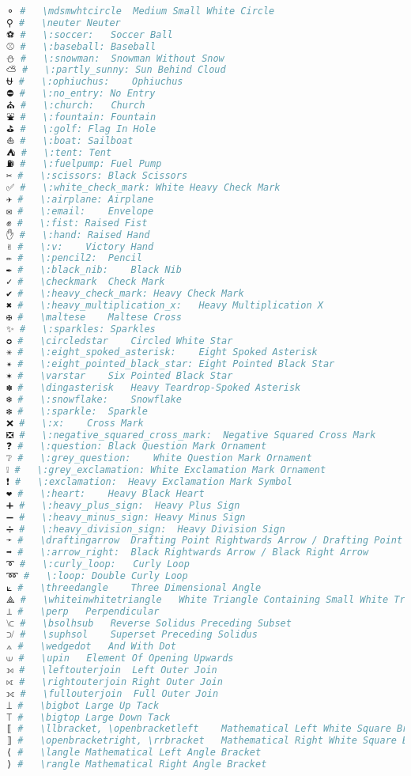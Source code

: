 \begin{lstlisting}[language=Julia, style=julia, linewidth=\textwidth]
⚬ #   \mdsmwhtcircle  Medium Small White Circle
⚲ #   \neuter Neuter
⚽ #   \:soccer:   Soccer Ball
⚾ #   \:baseball: Baseball
⛄ #   \:snowman:  Snowman Without Snow
⛅ #   \:partly_sunny: Sun Behind Cloud
⛎ #   \:ophiuchus:    Ophiuchus
⛔ #   \:no_entry: No Entry
⛪ #   \:church:   Church
⛲ #   \:fountain: Fountain
⛳ #   \:golf: Flag In Hole
⛵ #   \:boat: Sailboat
⛺ #   \:tent: Tent
⛽ #   \:fuelpump: Fuel Pump
✂ #   \:scissors: Black Scissors
✅ #   \:white_check_mark: White Heavy Check Mark
✈ #   \:airplane: Airplane
✉ #   \:email:    Envelope
✊ #   \:fist: Raised Fist
✋ #   \:hand: Raised Hand
✌ #   \:v:    Victory Hand
✏ #   \:pencil2:  Pencil
✒ #   \:black_nib:    Black Nib
✓ #   \checkmark  Check Mark
✔ #   \:heavy_check_mark: Heavy Check Mark
✖ #   \:heavy_multiplication_x:   Heavy Multiplication X
✠ #   \maltese    Maltese Cross
✨ #   \:sparkles: Sparkles
✪ #   \circledstar    Circled White Star
✳ #   \:eight_spoked_asterisk:    Eight Spoked Asterisk
✴ #   \:eight_pointed_black_star: Eight Pointed Black Star
✶ #   \varstar    Six Pointed Black Star
✽ #   \dingasterisk   Heavy Teardrop-Spoked Asterisk
❄ #   \:snowflake:    Snowflake
❇ #   \:sparkle:  Sparkle
❌ #   \:x:    Cross Mark
❎ #   \:negative_squared_cross_mark:  Negative Squared Cross Mark
❓ #   \:question: Black Question Mark Ornament
❔ #   \:grey_question:    White Question Mark Ornament
❕ #   \:grey_exclamation: White Exclamation Mark Ornament
❗ #   \:exclamation:  Heavy Exclamation Mark Symbol
❤ #   \:heart:    Heavy Black Heart
➕ #   \:heavy_plus_sign:  Heavy Plus Sign
➖ #   \:heavy_minus_sign: Heavy Minus Sign
➗ #   \:heavy_division_sign:  Heavy Division Sign
➛ #   \draftingarrow  Drafting Point Rightwards Arrow / Drafting Point Right Arrow
➡ #   \:arrow_right:  Black Rightwards Arrow / Black Right Arrow
➰ #   \:curly_loop:   Curly Loop
➿ #   \:loop: Double Curly Loop
⟀ #   \threedangle    Three Dimensional Angle
⟁ #   \whiteinwhitetriangle   White Triangle Containing Small White Triangle
⟂ #   \perp   Perpendicular
⟈ #   \bsolhsub   Reverse Solidus Preceding Subset
⟉ #   \suphsol    Superset Preceding Solidus
⟑ #   \wedgedot   And With Dot
⟒ #   \upin   Element Of Opening Upwards
⟕ #   \leftouterjoin  Left Outer Join
⟖ #   \rightouterjoin Right Outer Join
⟗ #   \fullouterjoin  Full Outer Join
⟘ #   \bigbot Large Up Tack
⟙ #   \bigtop Large Down Tack
⟦ #   \llbracket, \openbracketleft    Mathematical Left White Square Bracket
⟧ #   \openbracketright, \rrbracket   Mathematical Right White Square Bracket
⟨ #   \langle Mathematical Left Angle Bracket
⟩ #   \rangle Mathematical Right Angle Bracket

\end{lstlisting}
